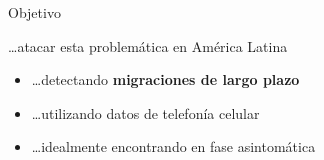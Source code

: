 \documentclass[xcolor=x11names]{beamer}
\begin{document}


\begin{frame}{Objetivo}
	\begin{block}{\ldots atacar esta problemática en América Latina}


	\begin{itemize}
		\item \ldots detectando \textbf{migraciones de largo plazo}
		\item \ldots utilizando datos de telefonía celular

		\item \ldots idealmente encontrando en fase asintomática
	\end{itemize}

	\end{block}
\end{frame}
\end{document}
